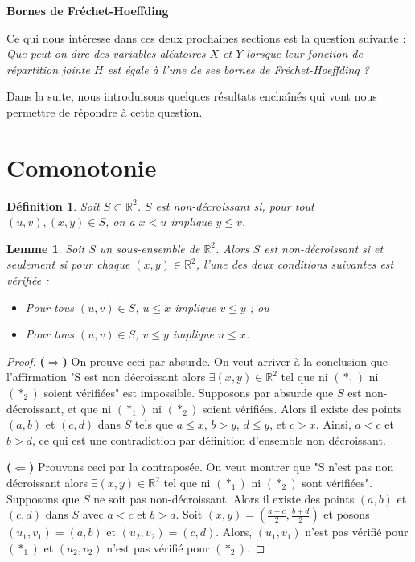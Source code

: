 \documentclass[a4paper,11pt]{amsbook}
\numberwithin{equation}{chapter}
\newtheorem{lemme}	    [theoreme]	 {Lemme}
\newtheorem{definition}	[theoreme]   {Définition}
\theoremstyle{definition}
\begin{document}
\textbf{Bornes de Fréchet-Hoeffding}


Ce qui nous intéresse dans ces deux prochaines sections est la question suivante : \\
\textit{Que peut-on dire des variables aléatoires \(X\) et \(Y\) lorsque leur fonction de répartition jointe \(H\) est égale à l’une de ses bornes de Fréchet-Hoeffding ?}

Dans la suite, nous introduisons quelques résultats enchaînés qui vont nous permettre de répondre à cette question.

\section{Comonotonie}

\begin{definition}\label{def:ND_set}
Soit \(S \subset \mathbb{R}^2\). \(S\) est \emph{non-décroissant} si, pour tout \((u,v), (x,y) \in S\), on a \(x  < u\) implique \( y \leq v\).
\end{definition}

\begin{lemme}\label{lem:ND_Set1}
Soit $S$ un sous-ensemble de $\mathbb{R}^2$. Alors $S$ est non-décroissant si et seulement si pour chaque $(x, y) \in \mathbb{R}^2$, l’une des deux conditions suivantes est vérifiée :
\begin{itemize}
    \item[\((\ast_1)\)] Pour tous $(u, v) \in S$, $u \leq x$ implique $v \leq y$ ; ou
    \item[\((\ast_2)\)] Pour tous $(u, v) \in S$, $v \leq y$ implique $u \leq x$.
\end{itemize}
\end{lemme}

\begin{proof}
\medskip

\textbf{(\(\Rightarrow\))} On prouve ceci par absurde. On veut arriver à la conclusion que l'affirmation "S est non décroissant alors \(\exists (x,y) \in \mathbb{R}^2\) tel que ni \((\ast_1)\) ni \((\ast_2)\) soient vérifiées" est impossible.  
Supposons par absurde que \( S \) est non-décroissant, et que ni \((\ast_1)\) ni \((\ast_2)\) soient vérifiées.  
Alors il existe des points \( (a, b) \) et \( (c, d) \) dans \( S \) tels que \( a \leq x \), \( b > y \), \( d \leq y \), et \( c > x \).  
Ainsi, \( a < c \) et \( b > d \), ce qui est une contradiction par définition d'ensemble non décroissant.
\medskip

\textbf{(\(\Leftarrow\))}  Prouvons ceci par la contraposée. On veut montrer que "S n'est pas non décroissant alors \(\exists (x,y) \in \mathbb{R}^2\) tel que ni \((\ast_1)\) ni \((\ast_2)\) sont vérifiées".  
Supposons que \( S \) ne soit pas non-décroissant. Alors il existe des points \( (a, b) \) et \( (c, d) \) dans \( S \) avec \( a < c \) et \( b > d \).  
Soit \( (x, y) = \left( \frac{a + c}{2}, \frac{b + d}{2} \right) \) et posons \( (u_1, v_1) = (a, b) \) et \( (u_2, v_2) = (c, d) \).  
Alors, \( (u_1, v_1) \) n’est pas vérifié pour \((\ast_1)\) et \( (u_2, v_2) \) n’est pas vérifié pour \((\ast_2)\).
\end{proof}
\end{document}
